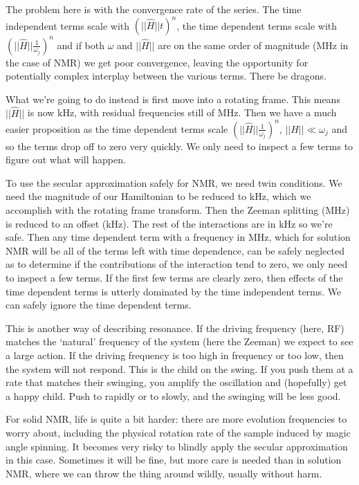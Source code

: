\documentclass[notitlepage,11pt]{article}
\begin{document}
The problem here is with the convergence rate of the series. The time independent terms scale with $(||\hat{H}||t)^n$, the time dependent terms scale with $(||\hat{H}||\frac{1}{\omega_j})^n$ and if both $\omega$ and $||\hat{H}||$ are on the same order of magnitude (MHz in the case of NMR) we get poor convergence, leaving the opportunity for potentially complex interplay between the various terms. There be dragons.

What we're going to do instead is first move into a rotating frame. This means $||\hat{H}||$ is now kHz, with residual frequencies still of MHz. Then we have a much easier proposition as the time dependent terms scale $(||\hat{H}||\frac{1}{\omega_j})^n$, $||\hat{H}|| \ll \omega_j$ and so the terms drop off to zero very quickly. We only need to inspect a few terms to figure out what will happen.

To use the secular approximation safely for NMR, we need twin conditions. We need the magnitude of our Hamiltonian to be reduced to kHz, which we accomplish with the rotating frame transform. Then the Zeeman splitting (MHz) is reduced to an offset (kHz). The rest of the interactions are in kHz so we're safe. Then any time dependent term with a frequency in MHz, which for solution NMR will be all of the terms left with time dependence, can be safely neglected as to determine if the contributions of the interaction tend to zero, we only need to inspect a few terms. If the first few terms are clearly zero, then effects of the time dependent terms is utterly dominated by the time independent terms. We can safely ignore the time dependent terms.

This is another way of describing resonance. If the driving frequency (here, RF) matches the `natural' frequency of the system (here the Zeeman) we expect to see a large action. If the driving frequency is too high in frequency or too low, then the system will not respond. This is the child on the swing. If you push them at a rate that matches their swinging, you amplify the oscillation and (hopefully) get a happy child. Push to rapidly or to slowly, and the swinging will be less good. 

For solid NMR, life is quite a bit harder: there are more evolution frequencies to worry about, including the physical rotation rate of the sample induced by magic angle spinning. It becomes very risky to blindly apply the secular approximation in this case. Sometimes it will be fine, but more care is needed than in solution NMR, where we can throw the thing around wildly, usually without harm.
\end{document}
